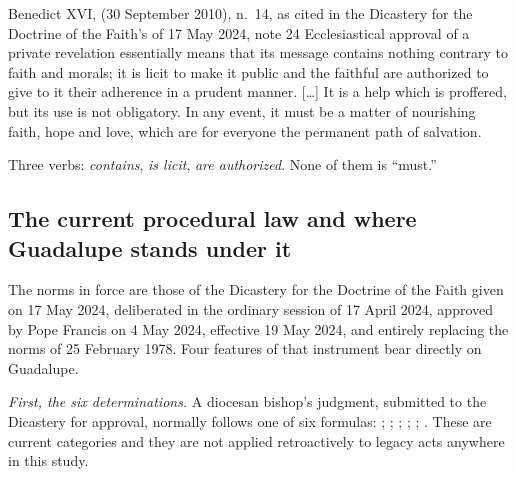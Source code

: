 \begin{operativetext}{Benedict XVI,  (30
September 2010), n.~14, as cited in the Dicastery for the Doctrine of
the Faith's  of 17 May 2024, note 24}
Ecclesiastical approval of a private revelation essentially means
that its message contains nothing contrary to faith and morals; it is
licit to make it public and the faithful are authorized to give to it
their adherence in a prudent manner. [\ldots] It is a help which is
proffered, but its use is not obligatory. In any event, it must be a
matter of nourishing faith, hope and love, which are for everyone the
permanent path of salvation.
\end{operativetext}

Three verbs: \emph{contains}, \emph{is licit}, \emph{are
authorized}. None of them is ``must.''

\subsection{The current procedural law and where Guadalupe stands
under it}

The norms in force are those of the Dicastery for the Doctrine of the
Faith given on 17 May 2024, deliberated in the ordinary session of 17
April 2024, approved by Pope Francis on 4 May 2024, effective 19 May
2024, and entirely replacing the norms of 25 February
1978.
Four features of that instrument bear directly on Guadalupe.

\emph{First, the six determinations.} A diocesan bishop's judgment,
submitted to the Dicastery for approval, normally follows one of six
formulas: ; ;
; ; ;
. These are current categories and
they are not applied retroactively to legacy acts anywhere in this
study.

